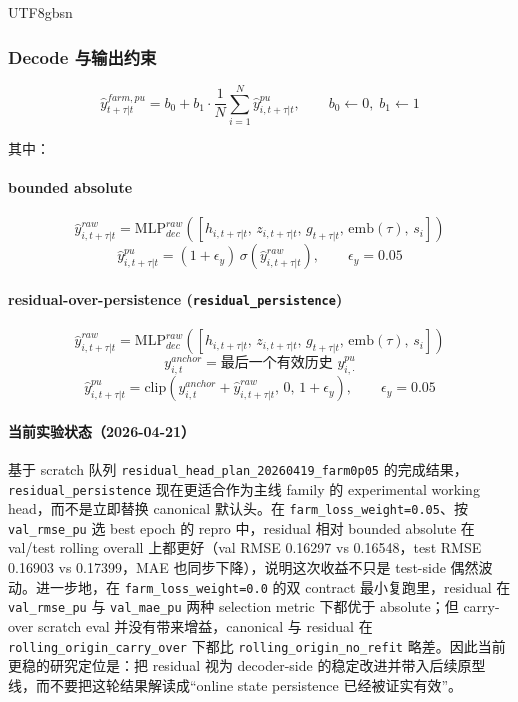 \documentclass[11pt]{article}
\begin{document}
\begin{CJK}{UTF8}{gbsn}
\subsubsection{Decode 与输出约束}
\[
\hat y^{farm,pu}_{t+\tau|t}
=
b_0+b_1\cdot \frac{1}{N}\sum_{i=1}^N \hat y^{pu}_{i,t+\tau|t},
\qquad b_0\leftarrow 0,\; b_1\leftarrow 1
\]

其中：

\paragraph{bounded absolute}
\[
\hat y^{raw}_{i,t+\tau|t}
=
\mathrm{MLP}^{raw}_{dec}\left(
[h_{i,t+\tau|t},\, z_{i,t+\tau|t},\, g_{t+\tau|t},\, \mathrm{emb}(\tau),\, s_i]
\right)
\]
\[
\hat y^{pu}_{i,t+\tau|t}
=
(1+\epsilon_y)\,\sigma\left(\hat y^{raw}_{i,t+\tau|t}\right),
\qquad \epsilon_y=0.05
\]


\paragraph{residual-over-persistence (\texttt{residual\_persistence})}
\[
\hat y^{raw}_{i,t+\tau|t}
=
\mathrm{MLP}^{raw}_{dec}\left(
[h_{i,t+\tau|t},\, z_{i,t+\tau|t},\, g_{t+\tau|t},\, \mathrm{emb}(\tau),\, s_i]
\right)
\]
\[
y^{anchor}_{i,t}
=
\text{最后一个有效历史 } y^{pu}_{i,\cdot}
\]
\[
\hat y^{pu}_{i,t+\tau|t}
=
\mathrm{clip}\!\left(
y^{anchor}_{i,t}+\hat y^{raw}_{i,t+\tau|t},
\,0,\,
1+\epsilon_y
\right),
\qquad \epsilon_y=0.05
\]


\paragraph{当前实验状态（2026-04-21）}
基于 scratch 队列 \texttt{residual\_head\_plan\_20260419\_farm0p05} 的完成结果，\texttt{residual\_persistence} 现在更适合作为主线 family 的 experimental working head，而不是立即替换 canonical 默认头。在 \texttt{farm\_loss\_weight=0.05}、按 \texttt{val\_rmse\_pu} 选 best epoch 的 repro 中，residual 相对 bounded absolute 在 val/test rolling overall 上都更好（val RMSE 0.16297 vs 0.16548，test RMSE 0.16903 vs 0.17399，MAE 也同步下降），说明这次收益不只是 test-side 偶然波动。进一步地，在 \texttt{farm\_loss\_weight=0.0} 的双 contract 最小复跑里，residual 在 \texttt{val\_rmse\_pu} 与 \texttt{val\_mae\_pu} 两种 selection metric 下都优于 absolute；但 carry-over scratch eval 并没有带来增益，canonical 与 residual 在 \texttt{rolling\_origin\_carry\_over} 下都比 \texttt{rolling\_origin\_no\_refit} 略差。因此当前更稳的研究定位是：把 residual 视为 decoder-side 的稳定改进并带入后续原型线，而不要把这轮结果解读成“online state persistence 已经被证实有效”。


\end{CJK}
\end{document}
